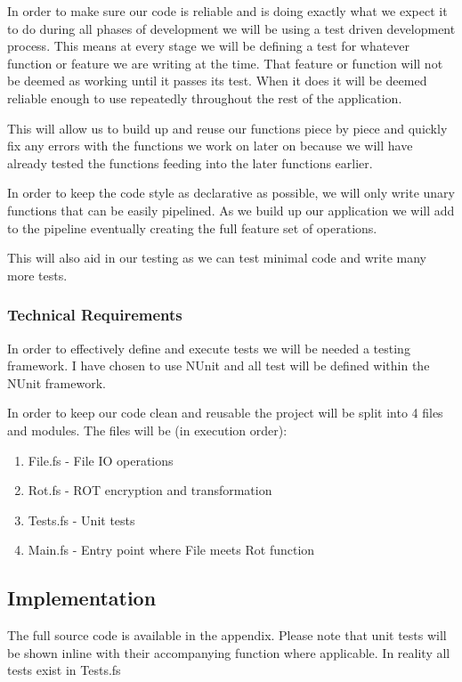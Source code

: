 In order to make sure our code is reliable and is doing exactly what we expect
it to do during all phases of development we will be using a test driven
development process. This means at every stage we will be defining a test for
whatever function or feature we are writing at the time. That feature or function
will not be deemed as working until it passes its test. When it does it will be
deemed reliable enough to use repeatedly throughout the rest of the application.

This will allow us to build up and reuse our functions piece by piece and quickly
fix any errors with the functions we work on later on because we will have already
tested the functions feeding into the later functions earlier.

In order to keep the code style as declarative as possible, we will only write
unary functions that can be easily pipelined. As we build up our application
we will add to the pipeline eventually creating the full feature set of operations.

This will also aid in our testing as we can test minimal code and write many more
tests.

\subsubsection{Technical Requirements}

In order to effectively define and execute tests we will be needed a testing
framework. I have chosen to use NUnit and all test will be defined within the
NUnit framework.

In order to keep our code clean and reusable the project will be split into 4
files and modules. The files will be (in execution order):
\begin{enumerate}
  \item File.fs - File IO operations
  \item Rot.fs - ROT encryption and transformation
  \item Tests.fs - Unit tests
  \item Main.fs - Entry point where File meets Rot function
\end{enumerate}

\subsection{Implementation}

The full source code is available in the appendix. Please note that unit tests will be shown inline
with their accompanying function where applicable. In reality all tests exist in Tests.fs

